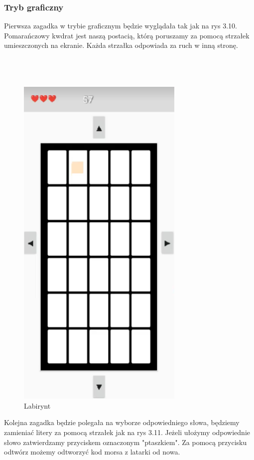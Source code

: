 \subsubsection{Tryb graficzny}
\hspace*{0.60cm}Pierwsza zagadka w trybie graficznym będzie wyglądała tak jak na rys 3.10.
Pomarańczowy kwdrat jest naszą postacią, którą poruszamy za pomocą strzałek umieszczonych na ekranie.
Każda strzałka odpowiada za ruch w inną stronę.
\\
\\
\\
\\
	\begin{figure}[!htb]
	\begin{center}
		\includegraphics[width=8cm]{rys/gra7.png}
		\caption{Labirynt}
		\label{rys:rysunek001}
	\end{center}
\end{figure}

\hspace*{0.60cm}Kolejna zagadka będzie polegała na wyborze odpowiedniego słowa, będziemy zamieniać litery za pomocą strzałek jak na rys 3.11. Jeżeli ułożymy odpowiednie słowo zatwierdzamy przyciskem oznaczonym "ptaszkiem". Za pomocą przycisku odtwórz możemy odtworzyć kod morsa z latarki od nowa.

